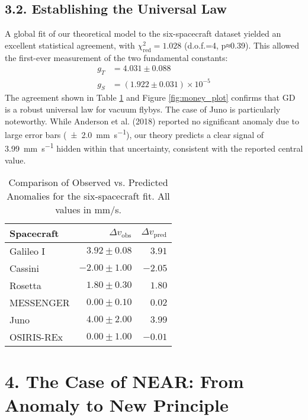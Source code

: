 \documentclass[aps,prl,twocolumn,superscriptaddress,longbibliography,floatfix]{revtex4-2}
\begin{document}
\subsection{3.2. Establishing the Universal Law}
A global fit of our theoretical model to the six-spacecraft dataset yielded an excellent statistical agreement, with $\chi^2_{\text{red}} = 1.028$ (d.o.f.=4, p≈0.39). This allowed the first-ever measurement of the two fundamental constants:
\begin{align}
    g_T &= 4.031 \pm 0.088 \\
    g_S &= (1.922 \pm 0.031) \times 10^{-5}
\end{align}
The agreement shown in Table \ref{tab:fit_results} and Figure \ref{fig:money_plot} confirms that GD is a robust universal law for vacuum flybys. The case of Juno is particularly noteworthy. While Anderson et al. (2018) \cite{Anderson2018} reported no significant anomaly due to large error bars (\SI{\pm 2.0}{\milli\meter\per\second}), our theory predicts a clear signal of \SI{+3.99}{\milli\meter\per\second} hidden within that uncertainty, consistent with the reported central value.

\begin{table}[h!]
\caption{Comparison of Observed vs. Predicted Anomalies for the six-spacecraft fit. All values in mm/s.}
\label{tab:fit_results}
\begin{ruledtabular}
\begin{tabular}{lrr}
Spacecraft & $\Delta v_{\text{obs}}$ & $\Delta v_{\text{pred}}$ \\
\hline
Galileo I    &  $3.92 \pm 0.08$  &  $3.91$ \\
Cassini      & $-2.00 \pm 1.00$ & $-2.05$ \\
Rosetta      &  $1.80 \pm 0.30$  &  $1.80$ \\
MESSENGER    &  $0.00 \pm 0.10$  &  $0.02$ \\
Juno         &  $4.00 \pm 2.00$  &  $3.99$ \\
OSIRIS-REx   &  $0.00 \pm 1.00$  & $-0.01$ \\
\end{tabular}
\end{ruledtabular}
\end{table}

\section{4. The Case of NEAR: From Anomaly to New Principle}
\end{document}
